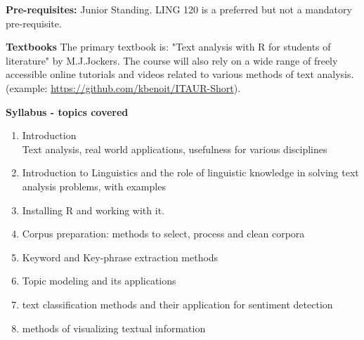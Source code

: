 \documentclass[11pt,a4paper]{article}
\begin{document}
\textbf{\large Pre-requisites:}
Junior Standing. LING 120 is a preferred but not a mandatory pre-requisite. 

\bigskip\textbf{\large Textbooks}
The primary textbook is: "Text analysis with R for students of literature" by M.J.Jockers. The course will also rely on a wide range of freely accessible online tutorials and videos related to various methods of text analysis. (example: \url{https://github.com/kbenoit/ITAUR-Short}).

\bigskip\textbf{\large Syllabus - topics covered}

\begin{enumerate}
\item Introduction
\\ Text analysis, real world applications, usefulness for various disciplines
\item Introduction to Linguistics and the role of linguistic knowledge in solving text analysis problems, with examples 
\item Installing R and working with it. 
\item Corpus preparation: methods to select, process and clean corpora
\item Keyword and Key-phrase extraction methods 
\item Topic modeling and its applications
\item text classification methods and their application for sentiment detection 
\item methods of visualizing textual information 
\end{enumerate}
\end{document}
